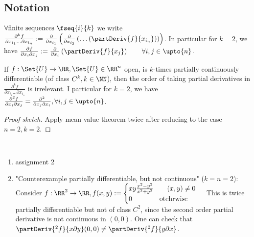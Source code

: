 \subsection*{Notation}
$\forall \text{finite sequences }\fseq{i}{k}$ we write $\frac{\partial^k f}{\partial x_{i_1}\ldots\partial x_{i_n}}:=\frac{\partial}{\partial x_{i_1}}\left(\frac{\partial}{\partial x_{i_2}}\left(\ldots\left(\partDeriv{f}{x_{i_n}}\right)\right)\right)$.
In particular for $k=2$, we have $\frac{\partial f}{\partial x_i\partial x_j}:=\frac{\partial}{\partial x_i}\left(\partDeriv{f}{x_j}\right)\qquad\forall i, j\in\upto{n}$. 

\begin{prop}
  If $f:\Set{U}\to\RR, \Set{U}\in\RR^n$ open, is $k$-times partially continuously differentiable (of class $C^k, k\in\NN$), then the order of taking partial derivatives in $\frac{\partial^k f}{\partial x_{i_1}\ldots\partial x_{i_n}}$ is irrelevant. I particular for $k=2$, we have $\frac{\partial^2 f}{\partial x_i\partial x_j}=\frac{\partial^2}{\partial x_j\partial x_i}, \forall i,j\in\upto{n}$.
\end{prop}
\begin{proof}[Proof sketch]
  Apply mean value theorem twice after reducing to the case $n=2, k=2$.
\end{proof}
\begin{exam}\ 
  \begin{enumerate}
  	\item assignment 2
  	\item "Counterexample partially differentiable, but not continuous" ($k=n=2$):
  	Consider $f:\RR^2\to\RR, f(x,y):=\begin{cases}xy\frac{x^2-y^2}{x^2+y^2}\qquad(x,y)\neq 0\\0\qquad\qquad\text{otehrwise}\end{cases}$
  	This is twice partially differentiable but not of class $C^2$, since the second order partial derivative is not continuous in $(0,0)$. One can check that $\partDeriv{^2f}{x\partial y}(0,0)\neq \partDeriv{^2f}{y\partial x}$.
  \end{enumerate}
\end{exam}